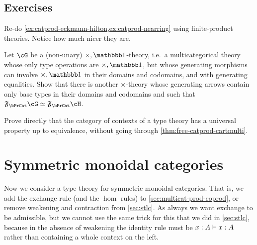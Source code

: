\subsection*{Exercises}

\begin{ex}\label{ex:catprod-ehnr-again}
  Re-do \cref{ex:catprod-eckmann-hilton,ex:catprod-nearring} using finite-product theories.
  Notice how much nicer they are.
\end{ex}

\begin{ex}\label{ex:catprod-thy-noprod}
  Let $\cG$ be a (non-unary) $\times,\unit$-theory, i.e.\ a multicategorical theory whose only type operations are $\times,\unit$, but whose generating morphisms can involve $\times,\unit$ in their domains and codomains, and with generating equalities.
  Show that there is another $\times$-theory \cH whose generating arrows contain only base types in their domains and codomains and such that $\F\bPrCat\cG\simeq \F\bPrCat\cH$.
\end{ex}

\begin{ex}\label{ex:catctx-univprop}
  Prove directly that the category of contexts of a type theory has a universal property up to equivalence, without going through \cref{thm:free-catprod-cartmulti}.
\end{ex}




\section{Symmetric monoidal categories}
\label{sec:symmoncat}

Now we consider a type theory for symmetric monoidal categories.
That is, we add the exchange rule (and the $\hom$ rules) to \cref{sec:multicat-prod-coprod}, or remove weakening and contraction from \cref{sec:stlc}.
As always we want exchange to be admissible, but we cannot use the same trick for this that we did in \cref{sec:stlc}, because in the absence of weakening the identity rule must be $x:A\vdash x:A$ rather than containing a whole context on the left.

